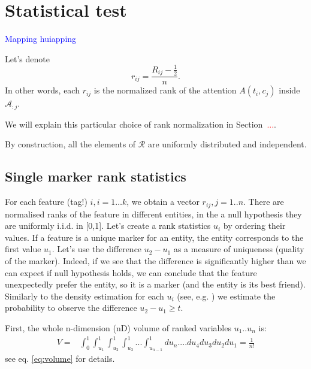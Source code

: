 \documentclass{llncs}
\begin{document}
\section{Statistical test}

\textcolor{blue}{Mapping huiapping} \cite{Solomon2018OptimalTO}

Let's denote
\[
r_{ij} = \frac{R_{ij} - \frac{1}{2}}{n}.
\]
In other words, each $r_{ij}$ is the normalized rank of the attention $A(t_i, c_j)$ inside $\mathcal{A}_{:j}$. 

We will explain this particular choice of rank normalization in Section~\textcolor{red}{...}.

By construction, all the elements of $\mathcal{R}$ are uniformly distributed and independent.


\subsection{Single marker rank statistics}




For each feature (tag!) $i,i=1\dots k$, we obtain a vector $r_{ij}, j=1..n$. There are normalised ranks of the feature in different entities, in the a null hypothesis they are uniformly i.i.d. in [0,1]. Let's create a rank statistics $u_i$ by ordering their values. If a feature is a unique marker for an entity, the entity corresponds to the first  value $u_1$. Let's use the difference $u_2-u_1$ as a measure of uniqueness (quality of the marker). Indeed, if we see that the difference is significantly higher than we can expect if null hypothesis holds, we can conclude that the feature unexpectedly prefer the entity, so it is a marker (and the entity is its best friend). Similarly to the density estimation for each $u_i$ (see, e.g. \cite{Gut:2009}) we estimate the probability to observe the difference $u_2 - u_1 \ge t$. 

First, the whole n-dimension (nD) volume of ranked variables $u_1 .. u_n$ is:
\begin{eqnarray*}
V = &\displaystyle \int_0^1\int_{u_1}^1\int_{u_2}^1\int_{u_3}^1...\int_{u_{n-1}}^1 du_n....du_4 du_3 du_2 du_1 =  \frac{1}{n!}
\end{eqnarray*}
see eq. \ref{eq:volume} for details.
\end{document}
